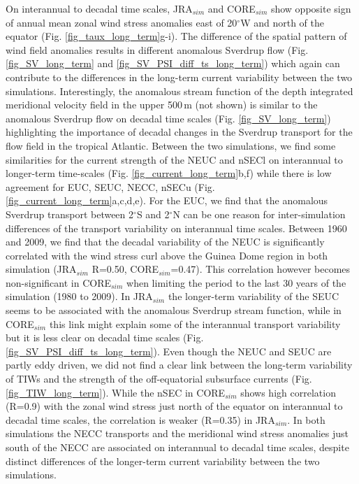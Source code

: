 \documentclass[os, manuscript]{copernicus}
\begin{document}
On interannual to decadal time scales, JRA$_{sim}$ and CORE$_{sim}$ show opposite sign of annual mean zonal wind stress anomalies east of 20$^{\circ}$W and north of the equator (Fig. \ref{fig_taux_long_term}g-i). The difference of the spatial pattern of wind field anomalies results in different anomalous Sverdrup flow (Fig. \ref{fig_SV_long_term} and \ref{fig_SV_PSI_diff_ts_long_term}) which again can contribute to the differences in the long-term current variability between the two simulations. Interestingly, the anomalous stream function of the depth integrated meridional velocity field in the upper 500$\,$m (not shown) is similar to the anomalous Sverdrup flow on decadal time scales (Fig. \ref{fig_SV_long_term}) highlighting the importance of decadal changes in the Sverdrup transport for the flow field in the tropical Atlantic. Between the two simulations, we find some similarities for the current strength of the NEUC and nSECl on interannual to longer-term time-scales (Fig. \ref{fig_current_long_term}b,f) while there is low agreement for EUC, SEUC, NECC, nSECu (Fig. \ref{fig_current_long_term}a,c,d,e). For the EUC, we find that the anomalous Sverdrup transport between 2$^{\circ}$S and 2$^{\circ}$N can be one reason for inter-simulation differences of the transport variability on interannual time scales. Between 1960 and 2009, we find that the decadal variability of the NEUC is significantly correlated with the wind stress curl above the Guinea Dome region in both simulation (JRA$_{sim}$ R=0.50, CORE$_{sim}$=0.47). This correlation however becomes non-significant in CORE$_{sim}$ when limiting the period to the last 30 years of the simulation (1980 to 2009). In JRA$_{sim}$ the longer-term variability of the SEUC seems to be associated with the anomalous Sverdrup stream function, while in CORE$_{sim}$ this link might explain some of the interannual transport variability but it is less clear on decadal time scales (Fig. \ref{fig_SV_PSI_diff_ts_long_term}). Even though the NEUC and SEUC are partly eddy driven, we did not find a clear link between the long-term variability of TIWs and the strength of the off-equatorial subsurface currents (Fig. \ref{fig_TIW_long_term}). While the nSEC in CORE$_{sim}$ shows high correlation (R=0.9) with the zonal wind stress just north of the equator on interannual to decadal time scales, the correlation is weaker (R=0.35) in JRA$_{sim}$. In both simulations the NECC transports and the meridional wind stress anomalies just south of the NECC are associated on interannual to decadal time scales, despite distinct differences of the longer-term current variability between the two simulations.
\end{document}
